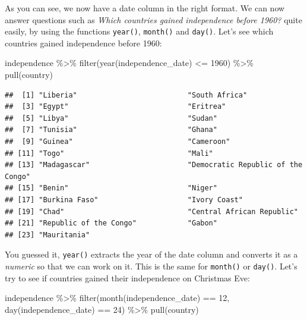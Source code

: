 \documentclass[
]{article}
\newenvironment{Shaded}{\begin{snugshade}}{\end{snugshade}}
\newcommand{\DecValTok}[1]{\textcolor[rgb]{0.00,0.00,0.81}{#1}}
\newcommand{\FunctionTok}[1]{\textcolor[rgb]{0.00,0.00,0.00}{#1}}
\newcommand{\NormalTok}[1]{#1}
\newcommand{\SpecialCharTok}[1]{\textcolor[rgb]{0.00,0.00,0.00}{#1}}
\begin{document}
As you can see, we now have a date column in the right format. We can now answer questions such as
\emph{Which countries gained independence before 1960?} quite easily, by using the functions \texttt{year()},
\texttt{month()} and \texttt{day()}. Let's see which countries gained independence before 1960:

\begin{Shaded}
\begin{Highlighting}[]
\NormalTok{independence }\SpecialCharTok{\%\textgreater{}\%}
  \FunctionTok{filter}\NormalTok{(}\FunctionTok{year}\NormalTok{(independence\_date) }\SpecialCharTok{\textless{}=} \DecValTok{1960}\NormalTok{) }\SpecialCharTok{\%\textgreater{}\%}
  \FunctionTok{pull}\NormalTok{(country)}
\end{Highlighting}
\end{Shaded}

\begin{verbatim}
##  [1] "Liberia"                          "South Africa"                    
##  [3] "Egypt"                            "Eritrea"                         
##  [5] "Libya"                            "Sudan"                           
##  [7] "Tunisia"                          "Ghana"                           
##  [9] "Guinea"                           "Cameroon"                        
## [11] "Togo"                             "Mali"                            
## [13] "Madagascar"                       "Democratic Republic of the Congo"
## [15] "Benin"                            "Niger"                           
## [17] "Burkina Faso"                     "Ivory Coast"                     
## [19] "Chad"                             "Central African Republic"        
## [21] "Republic of the Congo"            "Gabon"                           
## [23] "Mauritania"
\end{verbatim}

You guessed it, \texttt{year()} extracts the year of the date column and converts it as a \emph{numeric} so that we can work
on it. This is the same for \texttt{month()} or \texttt{day()}. Let's try to see if countries gained their independence on
Christmas Eve:

\begin{Shaded}
\begin{Highlighting}[]
\NormalTok{independence }\SpecialCharTok{\%\textgreater{}\%}
  \FunctionTok{filter}\NormalTok{(}\FunctionTok{month}\NormalTok{(independence\_date) }\SpecialCharTok{==} \DecValTok{12}\NormalTok{,}
         \FunctionTok{day}\NormalTok{(independence\_date) }\SpecialCharTok{==} \DecValTok{24}\NormalTok{) }\SpecialCharTok{\%\textgreater{}\%}
  \FunctionTok{pull}\NormalTok{(country)}
\end{Highlighting}
\end{Shaded}
\end{document}
